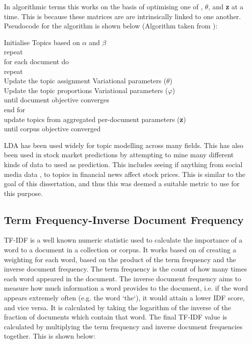 In algorithmic terms this works on the basis of optimising one of \boldmath{$\varphi$}, $\theta$, and \textbf{z} at a time. This is because these matrices are are intrinsically linked to one another. Pseudocode for the algorithm is shown below (Algorithm taken from \cite{ldaalgorithm}):
\begin{algorithm}
	\begin{algorithmic}
	\STATE Initialise Topics based on $\alpha$ and $\beta$\\
	repeat\\ 
	\hspace{1cm} for each document do\\
			\hspace{2cm} repeat\\ 
				\hspace{3cm}Update the topic assignment Variational parameters ($\theta$)\\
				\hspace{3cm}Update the topic proportions Variational parameters ($\varphi$)\\
			\hspace{2cm}until document objective converges\\
		\hspace{1cm}end for\\ 
		\hspace{1cm}update topics from aggregated per-document parameters (\textbf{z})\\
	until corpus objective converged\\
		\end{algorithmic}
\end{algorithm}

LDA has been used widely for topic modelling across many fields.  This has also been used in stock market predictions by attempting to mine many different kinds of data to used as prediction. This includes seeing if anything from social media data \cite{nguyen2015sentiment}, to topics in financial news \cite{feuerriegel2016analysis} affect stock prices. This is similar to the goal of this dissertation, and thus this was deemed a suitable metric to use for this purpose. 
 \subsection{Term Frequency-Inverse Document Frequency}
 TF-IDF is a well known numeric statistic used to calculate the importance of a word to a document in a collection or corpus. It works based on of creating a weighting for each word, based on the product of the term frequency and the inverse document frequency. The term frequency is the count of how many times each word appeared in the document. The inverse document frequency aims to measure how much information a word provides to the document, i.e. if the word appears extremely often (e.g. the word `the`), it would attain a lower IDF score, and vice versa. It is calculated by taking the logarithm of the inverse of the fraction of documents which contain that word. The final TF-IDF value is calculated by multiplying the term frequency and inverse document frequencies together. This is shown below:
 
